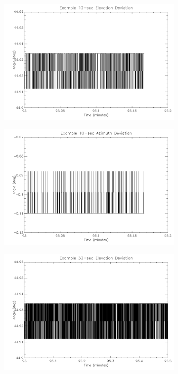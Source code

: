 {\begin{figure}[htbp]
\begin{subfigure}{0.45\textwidth}
		\includegraphics[width=1\linewidth]{appendix/img/campaign_results/latealt10sec.png}
		\caption{}
		\label{fig:sub:latealt10}
	\end{subfigure}
	\begin{subfigure}{0.45\textwidth}
		\includegraphics[width=1\linewidth]{appendix/img/campaign_results/lateaz10sec.png}
		\caption{}
		\label{fig:sub:lateaz10}
	\end{subfigure}
	\begin{subfigure}{0.45\textwidth}
		\includegraphics[width=1\linewidth]{appendix/img/campaign_results/latealt30sec.png}

\end{subfigure}
\end{figure}}
